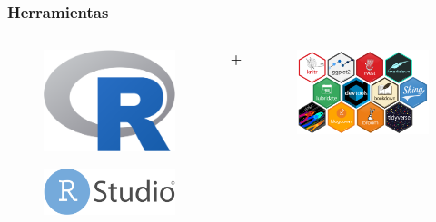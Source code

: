 \documentclass{beamer}
\begin{document}

\begin{frame}\frametitle{Herramientas}
	
	
	\begin{columns}
		\begin{column}{0.5\textwidth}
			\begin{figure}
				\centering
				\includegraphics[width=.5\textwidth]{logos/logo_R.png}
			\end{figure}
			\begin{figure}
				\centering
				\includegraphics[width=.7\textwidth]{images/rstudio.png}
			\end{figure}
		\end{column}
		\huge{\textbf{+}}
		\begin{column}{0.5\textwidth}
			\centering
			\begin{figure}
				\centering
				\includegraphics[width=.95\textwidth]{images/R_paquetes.png}
			\end{figure}
		\end{column}
	\end{columns}
	
\end{frame}
\end{document}

